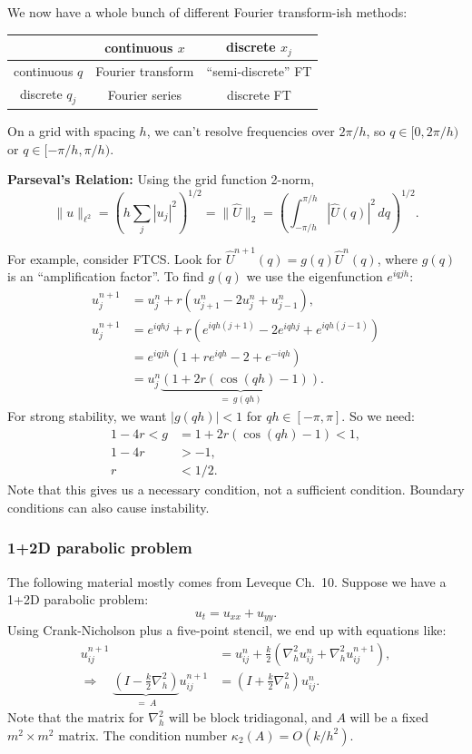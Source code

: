 \documentclass[12pt, a4paper]{article}
\theoremstyle{definition}
\theoremstyle{remark}
\numberwithin{equation}{section}
\begin{document}
We now have a whole bunch of different Fourier transform-ish methods:

\begin{center} \begin{tabular}{|c|cc|} \hline
                & continuous $x$ & discrete $x_j$ \\ \hline
continuous $q$  & Fourier transform & ``semi-discrete'' FT \\
discrete $q_j$  & Fourier series  & discrete FT \\ \hline
\end{tabular} \end{center}

On a grid with spacing $h$, we can't resolve frequencies over $2\pi/h$, so
\mbox{$q \in [0,2\pi/h)$} or $q \in [-\pi/h, \pi/h)$.

\textbf{Parseval's Relation:} Using the grid function 2-norm,
$$ \| u \|_{\ell^2} = \left(h \sum_j |u_j|^2\right)^{1/2}
= \| \hat{U} \|_2 = \left(\int_{-\pi/h}^{\pi/h} |\hat{U}(q)|^2 \, dq\right)^{1/2}. $$



For example, consider FTCS. Look for $\hat{U}^{n+1}(q) = g(q)\hat{U}^n(q)$,
where $g(q)$ is an ``amplification factor''. To find $g(q)$ we use the eigenfunction
$e^{iqjh}$:
\begin{align*}
u_j^{n+1} &= u_j^n + r(u_{j+1}^n - 2u_j^n + u_{j-1}^n), \\
u_j^{n+1} &= e^{iqhj} + r(e^{iqh(j+1)} - 2e^{iqhj} + e^{iqh(j-1)}) \\
 &= e^{iqjh}(1 + re^{iqh} - 2 + e^{-iqh}) \\
 &= u_j^n \underbrace{(1 + 2r(\cos(qh)-1))}_{=\ g(qh)}.
\end{align*}
For strong stability, we want $|g(qh)| < 1$ for $qh \in [-\pi, \pi]$. So we
need:
\begin{align*}
1 - 4r < g &= 1 + 2r(\cos(qh)-1) < 1, \\
1 - 4r &> -1, \\
r &< 1/2.
\end{align*}
Note that this gives us a necessary condition, not a sufficient condition.
Boundary conditions can also cause instability.

\newpage
\subsubsection{1+2D parabolic problem}

The following material mostly comes from Leveque Ch.~10. Suppose we have
a 1+2D parabolic problem:
$$ u_t = u_{xx} + u_{yy}. $$
Using Crank-Nicholson plus a five-point stencil, we end up with equations
like:
\begin{align*}
u_{ij}^{n+1} &= u_{ij}^n + \tfrac{k}{2}\left( \nabla_h^2 u_{ij}^n + \nabla_h^2 u_{ij}^{n+1} \right), \\
\Longrightarrow \quad \underbrace{(I - \tfrac{k}{2}\nabla_h^2)}_{=\ A} u_{ij}^{n+1} &=
(I + \tfrac{k}{2}\nabla_h^2) u_{ij}^n.
\end{align*}
Note that the matrix for $\nabla_h^2$ will be block tridiagonal, and $A$ will be
a fixed $m^2 \times m^2$ matrix. The condition number $\kappa_2(A) = O(k/h^2)$.
\end{document}
